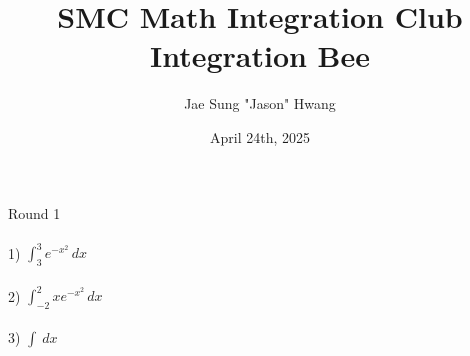 \documentclass[11pt]{article}
\title{SMC Math Integration Club\\Integration Bee}
\author{Jae Sung "Jason" Hwang}
\date{April 24th, 2025}
\begin{document}
\maketitle

\newpage
{Round 1}\\
\\ {1) } ${\displaystyle \int_{3}^{3} e^{-x^{2}} \,dx}$\\
\\ {2) } ${\displaystyle \int_{-2}^{2} xe^{-x^{2}} \,dx}$\\
\\ {3) } ${\displaystyle \int_{}^{}  \,dx}$
\end{document}
